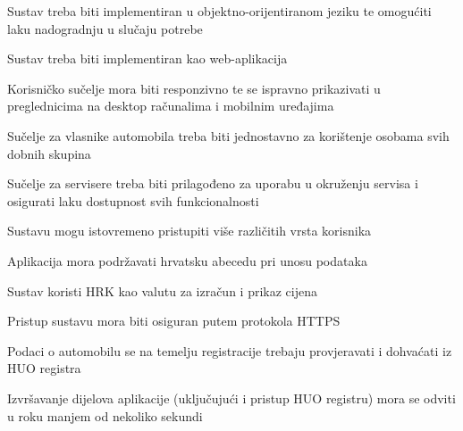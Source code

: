 			 	\begin{packed_item}

                \item Sustav treba biti implementiran u objektno-orijentiranom jeziku te omogućiti laku nadogradnju u slučaju potrebe
                \item Sustav treba biti implementiran kao web-aplikacija
                \item Korisničko sučelje mora biti responzivno te se ispravno prikazivati u preglednicima na desktop računalima i mobilnim uređajima
                \item Sučelje za vlasnike automobila treba biti jednostavno za korištenje osobama svih dobnih skupina
                \item Sučelje za servisere treba biti prilagođeno za uporabu u okruženju servisa i osigurati laku dostupnost svih funkcionalnosti
			 	\item Sustavu mogu istovremeno pristupiti više različitih vrsta korisnika
			 	\item Aplikacija mora podržavati hrvatsku abecedu pri unosu podataka
			 	\item Sustav koristi HRK kao valutu za izračun i prikaz cijena
			 	\item Pristup sustavu mora biti osiguran putem protokola HTTPS
			 	\item Podaci o automobilu se na temelju registracije trebaju provjeravati i dohvaćati iz HUO registra
			 	\item Izvršavanje dijelova aplikacije (uključujući i pristup HUO registru) mora se odviti u roku manjem od nekoliko sekundi

			 \end{packed_item}

